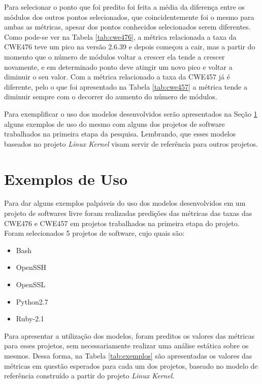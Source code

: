 Para selecionar o ponto que foi predito foi feita a média da diferença entre os
módulos dos outros pontos selecionados, que coincidentemente foi o mesmo para
ambas as métricas, apesar dos pontos conhecidos selecionados serem diferentes.
Como pode-se ver na Tabela \ref{tab:cwe476}, a métrica relacionada a taxa da
CWE476 teve um pico na versão 2.6.39 e depois começou a cair, mas a partir do
momento que o número de módulos voltar a crescer ela tende a crescer novamente,
e em determinado ponto deve atingir um novo pico e voltar a diminuir o seu
valor. Com a métrica relacionado a taxa da CWE457 já é diferente, pelo o que foi
apresentado na Tabela \ref{tab:cwe457} a métrica tende a diminuir sempre com o
decorrer do aumento do número de módulos.

Para exemplificar o uso dos modelos desenvolvidos serão apresentados na Seção
\ref{exemplosdeuso} alguns exemplos de uso do mesmo com alguns dos projetos de
software trabalhados na primeira etapa da pesquisa. Lembrando, que esses modelos
baseados no projeto \textit{Linux Kernel} visam servir de referência para outros
projetos.




\section{Exemplos de Uso}\label{exemplosdeuso}

Para dar alguns exemplos palpáveis do uso dos modelos desenvolvidos em um
projeto de softwares livre foram realizadas predições das métricas das taxas das
CWE476 e CWE457 em projetos trabalhados na primeira etapa do projeto. Foram
selecionados 5 projetos de software, cujo quais são:

\begin{itemize}
 \item Bash
 \item OpenSSH
 \item OpenSSL
 \item Python2.7
 \item Ruby-2.1
\end{itemize}

Para apresentar a utilização dos modelos, foram preditos os valores das métricas
para esses projetos, sem necessariamente realizar uma análise estática sobre os
mesmos. Dessa forma, na Tabela \ref{tab:exemplos} são apresentadas os valores
das métricas em questão esperados para cada um dos projetos, baseado no modelo de
referência construído a partir do projeto \textit{Linux Kernel}.

